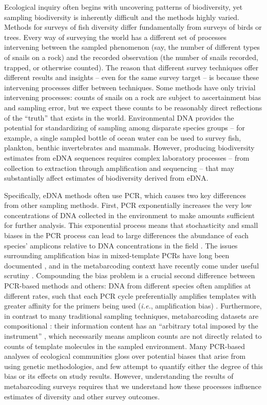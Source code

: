 \documentclass[fleqn,11pt,lineno]{wlscirep}
\begin{document}
Ecological inquiry often begins with uncovering patterns of biodiversity, yet sampling biodiversity is inherently difficult and the methods highly varied. Methods for surveys of fish diversity differ fundamentally from surveys of birds or trees. Every way of surveying the world has a different set of processes intervening between the sampled phenomenon (say, the number of different types of snails on a rock) and the recorded observation (the number of snails recorded, trapped, or otherwise counted). The reason that different survey techniques offer different results and insights -- even for the same survey target -- is because these intervening processes differ between techniques. Some methods have only trivial intervening processes: counts of snails on a rock are subject to ascertainment bias and sampling error, but we expect these counts to be reasonably direct reflections of the ``truth'' that exists in the world. Environmental DNA provides the potential for standardizing of sampling among disparate species groups -- for example, a single sampled bottle of ocean water can be used to survey fish, plankton, benthic invertebrates and mammals. However, producing biodiversity estimates from eDNA sequences requires complex laboratory processes -- from collection to extraction through amplification and sequencing -- that may substantially affect estimates of biodiversity derived from eDNA.

Specifically, eDNA methods often use PCR, which causes two key differences from other sampling methods. First, PCR exponentially increases the very low concentrations of DNA collected in the environment to make amounts sufficient for further analysis. This exponential process means that stochasticity and small biases in the PCR process can lead to large differences the abundance of each species' amplicons relative to DNA concentrations in the field \cite{pawluczyk2015quantitative, odonnellPrimers, deagle_quantifying_2013}. The issues surrounding amplification bias in mixed-template PCRs have long been documented \cite{polz1998bias, suzuki1996bias}, and in the metabarcoding context have recently come under useful scrutiny \cite{elbrecht2015can, mclaren2019consistent, pinol2019choice}.  Compounding the bias problem is a crucial second difference between PCR-based methods and others: DNA from different species often amplifies at different rates, such that each PCR cycle preferentially amplifies templates with greater affinity for the primers being used (\textit{i.e.}, amplification bias) \cite{bellemain2010its, clarke2014environmental}. Furthermore, in contrast to many traditional sampling techniques, metabarcoding datasets are compositional \cite{gloor2017microbiome}: their information content has an ``arbitrary total imposed by the instrument'' \cite{gloor2017microbiome}, which necessarily means amplicon counts are not directly related to counts of template molecules in the sampled environment. Many PCR-based analyses of ecological communities gloss over potential biases that arise from using genetic methodologies, and few attempt to quantify either the degree of this bias or its effects on study results. However, understanding the results of metabarcoding surveys requires that we understand how these processes influence estimates of diversity and other survey outcomes. 
\end{document}
